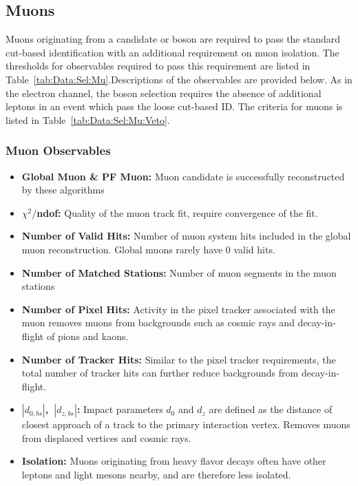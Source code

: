 


\subsection{Muons}\label{ch:IdIso:Mu}

Muons originating from a candidate \Wpm or \Z boson are required to pass the standard cut-based identification with an additional requirement on muon isolation. The thresholds for observables required to pass this requirement are listed in Table~\ref{tab:Data:Sel:Mu}.Descriptions of the observables are provided below. As in the electron channel, the \Wpm boson selection requires the absence of additional leptons in an event which pass the loose cut-based ID. The criteria for muons is listed in Table~\ref{tab:Data:Sel:Mu:Veto}. 

\subsubsection{Muon Observables}

\begin{itemize}
    \item \textbf{Global Muon \& PF Muon:} Muon candidate is successfully reconstructed by these algorithms
    \item \textbf{$\chi^2/$ndof:} Quality of the muon track fit, require convergence of the fit.
    \item \textbf{Number of Valid Hits:} Number of muon system hits included in the global muon reconstruction. Global muons rarely have 0 valid hits.
    \item \textbf{Number of Matched Stations:} Number of muon segments in the muon stations
    \item \textbf{Number of Pixel Hits:} Activity in the pixel tracker associated with the muon removes muons from backgrounds such as cosmic rays and decay-in-flight of pions and kaons. 
    \item \textbf{Number of Tracker Hits:} Similar to the pixel tracker requirements, the total number of tracker hits can further reduce backgrounds from decay-in-flight.
    \item \textbf{$|d_{0,bs}|$,~$|d_{z,bs}|$:} Impact parameters $d_0$ and $d_z$ are defined as the distance of closest approach of a track to the primary interaction vertex. Removes muons from displaced vertices and cosmic rays. 
    \item \textbf{Isolation:} Muons originating from heavy flavor decays often have other leptons and light mesons nearby, and are therefore less isolated.
\end{itemize}




